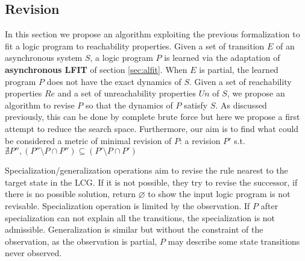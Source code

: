 \subsection{Revision}
\label{sec:algorithm}

    In this section we propose an algorithm exploiting the previous formalization to fit a logic program to reachability properties.
    Given a set of transition $E$ of an asynchronous system $S$, a logic program $P$ is learned via the adaptation of \textbf{asynchronous LFIT} of section \ref{sec:alfit}.
    When $E$ is partial, the learned program $P$ does not have the exact dynamics of $S$.
    Given a set of reachability properties $Re$ and a set of unreachability properties $Un$ of $S$, we propose an algorithm to revise $P$ so that the dynamics of $P$ satisfy $S$.
    As discussed previously, this can be done by complete brute force but here we propose a first attempt to reduce the search space.
    Furthermore, our aim is to find what could be considered a metric of minimal revision of $P$:
    a revision $P'$ s.t. $\nexists P'', (P''\setminus P \cap P'')\subseteq (P' \setminus P \cap P')$
   
    Specialization/generalization operations aim to revise the rule nearest to the target state in the LCG. If it is not possible, they try to revise the successor, if there is no possible solution, return $\varnothing$ to show the input logic program is not revisable. Specialization operation is limited by the observation. If $P$ after specialization can not explain all the transitions, the specialization is not admissible. %
    Generalization is similar but without the constraint of the observation, as the observation is partial, $P$ may describe some state transitions never observed.
   
